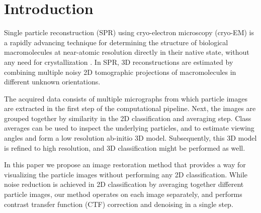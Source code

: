 \documentclass[review]{elsarticle}
\begin{document}
% 
\section{Introduction}
Single particle reconstruction (SPR) using cryo-electron microscopy (cryo-EM) is 
a rapidly advancing technique for determining the structure of biological
macromolecules at near-atomic resolution directly in their native state, without any need for crystallization \cite{cryoem_rev, rev2, nogales, sigworth_rev, kuhlbrandt}. In SPR, 3D reconstructions are estimated by combining multiple noisy 2D tomographic projections
of macromolecules in different unknown orientations.

The acquired data consists of multiple micrographs from which particle images 
are extracted in the first step of the computational pipeline. Next, the images are grouped together
by similarity in the 2D classification and averaging step. Class averages can be used
to inspect the underlying particles, and
to estimate viewing angles and form a low resolution ab-initio 3D model. Subsequently, this 3D model 
is refined to high resolution, and 3D classification might be performed as well. 

In this paper we propose an image restoration method that provides a way for 
visualizing the particle images without performing any 2D classification. 
While noise reduction is achieved in 2D classification by averaging together 
different particle images, our method operates on each image separately, and 
performs contrast transfer function (CTF) correction and denoising in a single 
step. 
\end{document}
